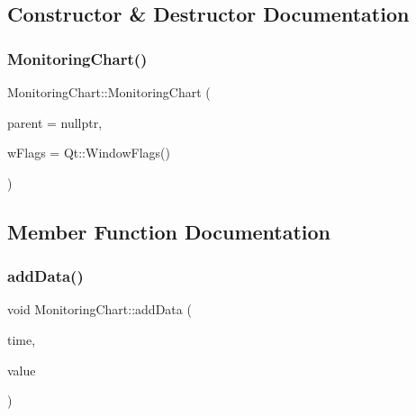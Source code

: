 \subsection{Constructor \& Destructor Documentation}
\mbox{\label{class_monitoring_chart_ae630e540b605552c53c45072ce355115}} 
\subsubsection{\texorpdfstring{Monitoring\+Chart()}{MonitoringChart()}}
{\footnotesize\ttfamily Monitoring\+Chart\+::\+Monitoring\+Chart (\begin{DoxyParamCaption}\item[{Q\+Graphics\+Item $\ast$}]{parent = {\ttfamily nullptr},  }\item[{Qt\+::\+Window\+Flags}]{w\+Flags = {\ttfamily Qt\+:\+:WindowFlags()} }\end{DoxyParamCaption})\hspace{0.3cm}{\ttfamily [explicit]}}



\subsection{Member Function Documentation}
\mbox{\label{class_monitoring_chart_a8452696969a328012d0b6657094d7601}} 
\subsubsection{\texorpdfstring{add\+Data()}{addData()}}
{\footnotesize\ttfamily void Monitoring\+Chart\+::add\+Data (\begin{DoxyParamCaption}\item[{const Q\+Date\+Time \&}]{time,  }\item[{int}]{value }\end{DoxyParamCaption})}

\mbox{\label{class_monitoring_chart_ab9835838b91840a4b2578be95a2f9bab}} 
